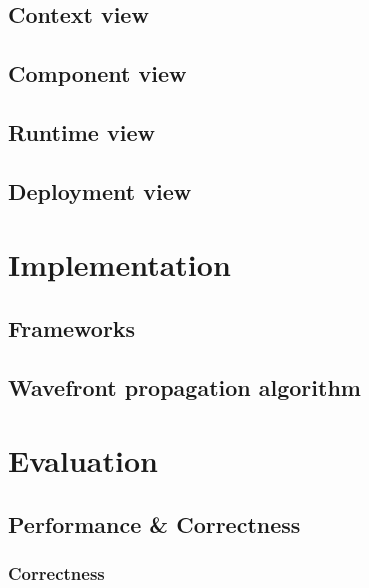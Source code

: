 \documentclass[
	11pt,
	a4paper,
	usegeometry,
	twoside,
	openright,
	toc=chapterentrywithdots
]{scrbook}
\begin{document}
		\section{Context view}
		
		
		\section{Component view}
		
		
		\section{Runtime view}
		
		
		\section{Deployment view}
		
	
	\chapter{Implementation}
	
		\section{Frameworks}
		
	
		\section{Wavefront propagation algorithm}
		
	
	\chapter{Evaluation}
	
		\section{Performance \& Correctness}
		
			\subsection{Correctness}
			
\end{document}
